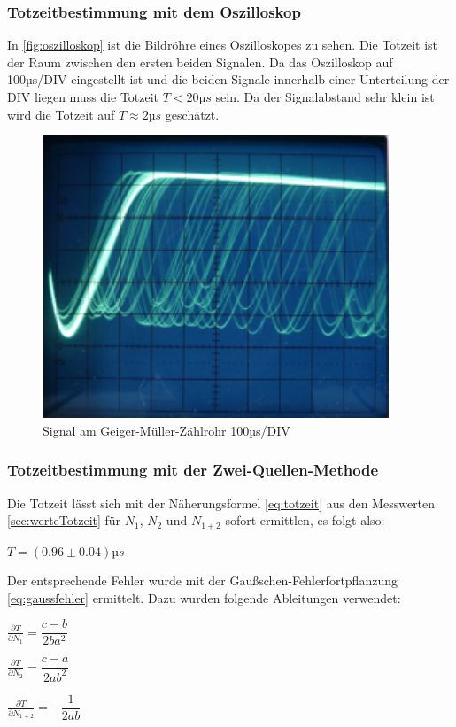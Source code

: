 \subsubsection{Totzeitbestimmung mit dem Oszilloskop}
\label{sec:totzeitO}
In \autoref{fig:oszilloskop} ist die Bildröhre eines Oszilloskopes zu sehen. Die Totzeit ist der Raum 
zwischen den ersten beiden Signalen. Da das Oszilloskop auf 100µs/DIV eingestellt ist und die beiden Signale 
innerhalb einer Unterteilung der DIV liegen muss die Totzeit $T<20µs$ sein. Da der Signalabstand sehr klein ist 
wird die Totzeit auf $T \approx 2µs$ geschätzt.
\begin{figure}
  \centering
  \includegraphics{oszilloskop.pdf}
  \caption{Signal am Geiger-Müller-Zählrohr 100µs/DIV}
  \label{fig:oszilloskop}
\end{figure}
\subsubsection{Totzeitbestimmung mit der Zwei-Quellen-Methode}
\label{sec:totzeitZ}
Die Totzeit lässt sich mit der Näherungsformel \autoref{eq:totzeit} aus den Messwerten 
\autoref{sec:werteTotzeit} für $N_1$, $N_2$ und $N_{1+2}$ sofort ermittlen, es folgt also:
\begin{center}
  $T=(0.96\pm0.04) µs$
\end{center}
Der entsprechende Fehler wurde mit der Gaußschen-Fehlerfortpflanzung \autoref{eq:gaussfehler} ermittelt.
Dazu wurden folgende Ableitungen verwendet:
\begin{center}
  $\frac{\partial T}{\partial N_1}=\dfrac{c-b}{2ba^2}$\\
\end{center}
\begin{center}
  $\frac{\partial T}{\partial N_2}=\dfrac{c-a}{2ab^2}$\\
\end{center}
\begin{center}
  $\frac{\partial T}{\partial N_{1+2}}=-\dfrac{1}{2ab}$
\end{center}

